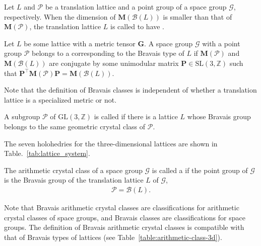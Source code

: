 Let $L$ and $\mathcal{P}$ be a translation lattice and a point group of a space group $\mathcal{G}$, respectively.
When the dimension of $\bm{M}(\mathcal{B}(L))$ is smaller than that of $\bm{M}(\mathcal{P})$, the translation lattice $L$ is called to have .

\begin{screen}
  \begin{defn}
    Let $L$ be some lattice with a metric tensor $\bm{G}$.
    A space group $\mathcal{G}$ with a point group $\mathcal{P}$ belongs to a  corresponding to the Bravais type of $L$ if $\bm{M}(\mathcal{P})$ and $\bm{M}(\mathcal{B}(L))$ are conjugate by some unimodular matrix $\bm{P} \in \mathrm{SL}(3, \mathbb{Z})$ such that $\bm{P}^{\top} \bm{M}(\mathcal{P}) \bm{P} = \bm{M}(\mathcal{B}(L))$.
  \end{defn}
\end{screen}

Note that the definition of Bravais classes is independent of whether a translation lattice is a specialized metric or not.

\begin{screen}
  \begin{defn}[holohedry]
    A subgroup $\mathcal{P}$ of $\mathrm{GL}(3, \mathbb{Z})$ is called  if there is a lattice $L$ whose Bravais group belongs to the same geometric crystal class of $\mathcal{P}$.
  \end{defn}
\end{screen}

The seven holohedries for the three-dimensional lattices are shown in Table.~\ref{tab:lattice_system}.

\begin{screen}
  \begin{defn}
    The arithmetic crystal class of a space group $\mathcal{G}$ is called a  if the point group of $\mathcal{G}$ is the Bravais group of the translation lattice $L$ of $\mathcal{G}$,
    \begin{align}
      \mathcal{P} = \mathcal{B}(L).
    \end{align}
  \end{defn}
\end{screen}

Note that Bravais arithmetic crystal classes are classifications for arithmetic crystal classes of space groups, and Bravais classes are classifications for space groups.
The definition of Bravais arithmetic crystal classes is compatible with that of Bravais types of lattices (see Table~\ref{table:arithmetic-class-3d}).

